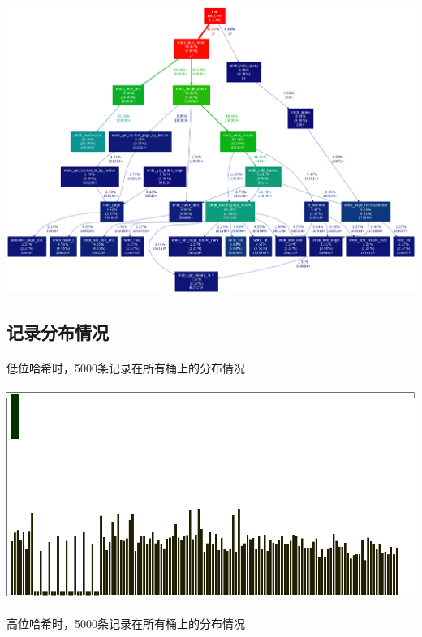 \documentclass{article}
\begin{document}
        \paragraph{}\includegraphics[scale=0.5]{proff_big_record.png}
    \subsection{记录分布情况}
        \paragraph{}
            低位哈希时，5000条记录在所有桶上的分布情况
        \paragraph{}\includegraphics[scale=0.5]{pic5000_l.png}
        \paragraph{}
            高位哈希时，5000条记录在所有桶上的分布情况
\end{document}
